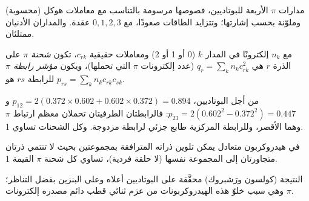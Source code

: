 \begin{omfigure}

{\small مدارات $\pi$ الأربعة للبوتاديين، فصوصها مرسومة بالتناسب مع
معاملات هوكل (محسوبة) وملوّنة بحسب إشارتها؛ وتتزايد الطاقات
صعودًا، مع $0, 1, 2, 3$ عقدة. والمداران الأدنيان ممتلئان.}
\end{omfigure}

\begin{definition}\label{def:b2:huckel:indices}
مع $n_k$ إلكترونًا في المدار $k$ (0 أو 1 أو 2) ومعاملات حقيقية $c_{rk}$، تكون
\emph{شحنة $\pi$} على الذرة $r$ هي $q_r = \sum_k n_kc_{rk}^2$ (عدد
إلكترونات $\pi$ التي تحملها)، ويكون \emph{مؤشر رابطة $\pi$}
للرابطة $rs$ هو $p_{rs} = \sum_k n_kc_{rk}c_{sk}$.
\end{definition}

من أجل البوتاديين، $p_{12} = 2(0.372 \times 0.602 + 0.602 \times 0.372) = 0.894$ و$p_{23} =
2(0.602^2 - 0.372^2) = 0.447$: فالرابطتان الطرفيتان تحملان معظم ارتباط $\pi$ وهما
الأقصر، وللرابطة المركزية طابع جزئي لرابطة مزدوجة. وكل الشحنات تساوي
1.

\begin{proposition}\label{prop:b2:huckel:alternant}
في هيدروكربون متعادل يمكن تلوين ذراته المترافقة بمجموعتين بحيث
لا تنتمي ذرتان متجاورتان إلى المجموعة نفسها (لا حلقة فردية)، تساوي كل شحنة $\pi$ القيمة 1.
\end{proposition}

\admitted

النتيجة (كولسون ورَشبروك) محقَّقة على البوتاديين أعلاه وعلى البنزين بفضل
التناظر؛ وهي سبب خلوّ هذه الهيدروكربونات من عزم ثنائي قطب دائم مصدره
إلكترونات $\pi$.

